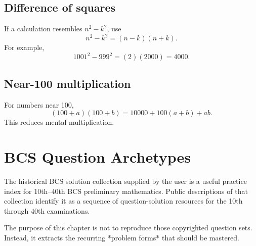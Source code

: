 \documentclass[12pt,a4paper,oneside]{book}
\begin{document}
\section{Difference of squares}
If a calculation resembles \(n^2-k^2\), use
\[n^2-k^2=(n-k)(n+k).\]
For example,
\[1001^2-999^2=(2)(2000)=4000.\]

\section{Near-100 multiplication}
For numbers near 100,
\[(100+a)(100+b)=10000+100(a+b)+ab.\]
This reduces mental multiplication.

\chapter[BCS Question Archetypes]{BCS Question Archetypes}
The historical BCS solution collection supplied by the user is a useful practice index for 10th--40th BCS preliminary mathematics. Public descriptions of that collection identify it as a sequence of question-solution resources for the 10th through 40th examinations. \cite{bcsarchive}

The purpose of this chapter is not to reproduce those copyrighted question sets. Instead, it extracts the recurring *problem forms* that should be mastered.
\end{document}
